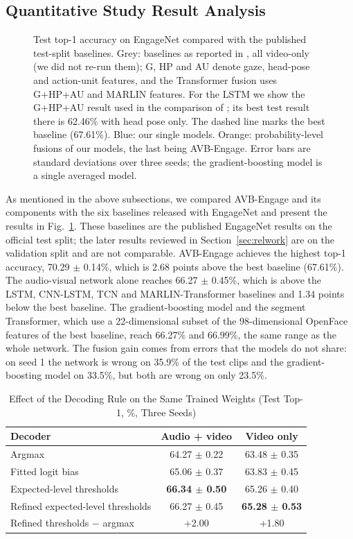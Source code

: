 \documentclass[journal]{IEEEtran}
\newcommand{\ournet}{AVB-Engage}
\begin{document}
\subsection{Quantitative Study Result Analysis}

\begin{figure}[!t]
\centering

\caption{Test top-1 accuracy on EngageNet compared with the published test-split baselines. Grey: baselines as reported in \cite{singh2023engagenet}, all video-only (we did not re-run them); G, HP and AU denote gaze, head-pose and action-unit features, and the Transformer fusion uses G+HP+AU and MARLIN features. For the LSTM we show the G+HP+AU result used in the comparison of \cite{singh2023engagenet}; its best test result there is 62.46\% with head pose only. The dashed line marks the best baseline (67.61\%). Blue: our single models. Orange: probability-level fusions of our models, the last being \ournet. Error bars are standard deviations over three seeds; the gradient-boosting model is a single averaged model.}
\label{fig_results}
\end{figure}

As mentioned in the above subsections, we compared \ournet{} and its components with the six baselines released with EngageNet and present the results in Fig.~\ref{fig_results}. These baselines are the published EngageNet results on the official test split; the later results reviewed in Section~\ref{sec:relwork} are on the validation split and are not comparable. \ournet{} achieves the highest top-1 accuracy, 70.29 $\pm$ 0.14\%, which is 2.68 points above the best baseline (67.61\%). The audio-visual network alone reaches 66.27 $\pm$ 0.45\%, which is above the LSTM, CNN-LSTM, TCN and MARLIN-Transformer baselines and 1.34 points below the best baseline. The gradient-boosting model and the segment Transformer, which use a 22-dimensional subset of the 98-dimensional OpenFace features of the best baseline, reach 66.27\% and 66.99\%, the same range as the whole network. The fusion gain comes from errors that the models do not share: on seed 1 the network is wrong on 35.9\% of the test clips and the gradient-boosting model on 33.5\%, but both are wrong on only 23.5\%.

\begin{table}[!t]
\setlength{\tabcolsep}{3pt}
\renewcommand{\arraystretch}{1.2}
\caption{Effect of the Decoding Rule on the Same Trained Weights (Test Top-1, \%, Three Seeds)}
\label{tab_decoder}
\centering
\begin{tabular}{lcc}
\hline
Decoder & Audio + video & Video only\\
\hline
Argmax & 64.27 $\pm$ 0.22 & 63.48 $\pm$ 0.35\\
Fitted logit bias & 65.06 $\pm$ 0.37 & 63.83 $\pm$ 0.45\\
Expected-level thresholds & \textbf{66.34 $\pm$ 0.50} & 65.26 $\pm$ 0.40\\
Refined expected-level thresholds & 66.27 $\pm$ 0.45 & \textbf{65.28 $\pm$ 0.53}\\
\hline
Refined thresholds $-$ argmax & +2.00 & +1.80\\
\hline
\end{tabular}
\end{table}
\end{document}
